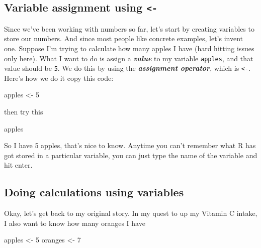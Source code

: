\documentclass[
]{book}
\newenvironment{Shaded}{\begin{snugshade}}{\end{snugshade}}
\newcommand{\DecValTok}[1]{\textcolor[rgb]{0.00,0.00,0.81}{#1}}
\newcommand{\NormalTok}[1]{#1}
\newcommand{\OtherTok}[1]{\textcolor[rgb]{0.56,0.35,0.01}{#1}}
\begin{document}
\hypertarget{variable-assignment-using--}{%
\subsection{\texorpdfstring{Variable assignment using \texttt{\textless{}-}}{Variable assignment using \textless-}}\label{variable-assignment-using--}}

Since we've been working with numbers so far, let's start by creating variables to store our numbers. And since most people like concrete examples, let's invent one. Suppose I'm trying to calculate how many apples I have (hard hitting issues only here).
What I want to do is assign a \textbf{\emph{value}} to my variable \texttt{apples}, and that value should be \texttt{5}. We do this by using the \textbf{\emph{assignment operator}}, which is \texttt{\textless{}-}. Here's how we do it copy this code:

\begin{Shaded}
\begin{Highlighting}[]
\NormalTok{apples }\OtherTok{\textless{}{-}} \DecValTok{5}
\end{Highlighting}
\end{Shaded}

then try this

\begin{Shaded}
\begin{Highlighting}[]
\NormalTok{apples}
\end{Highlighting}
\end{Shaded}

So I have 5 apples, that's nice to know. Anytime you can't remember what R has got stored in a particular variable, you can just type the name of the variable and hit enter.

\hypertarget{doing-calculations-using-variables}{%
\subsection{Doing calculations using variables}\label{doing-calculations-using-variables}}

Okay, let's get back to my original story. In my quest to up my Vitamin C intake, I also want to know how many oranges I have

\begin{Shaded}
\begin{Highlighting}[]
\NormalTok{apples }\OtherTok{\textless{}{-}} \DecValTok{5}
\NormalTok{oranges }\OtherTok{\textless{}{-}} \DecValTok{7}
\end{Highlighting}
\end{Shaded}
\end{document}
